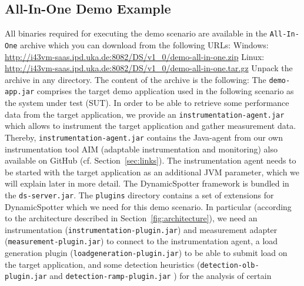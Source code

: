 \documentclass{report}
\newcommand{\DS}{DynamicSpotter }
\newcommand{\link}[1]{\textcolor[rgb]{0.0,0.0,1.0}{\href{#1}{#1}}}
\begin{document}
\subsection{All-In-One Demo Example}
All binaries required for executing the demo scenario are available in the \texttt{All-In-One} archive which you can
download from the following URLs:
\newline
\newline
Windows: \link{http://i43vm-saas.ipd.uka.de:8082/DS/v1\_0/demo-all-in-one.zip}
\newline
Linux: \link{http://i43vm-saas.ipd.uka.de:8082/DS/v1\_0/demo-all-in-one.tar.gz}
\newline
\newline
Unpack the archive in any directory. The content of the archive is the following:
The \texttt{demo-app.jar} comprises the target demo application used in the following scenario as the system under test
(SUT). In order to be able to retrieve some performance data from the target application, we provide an
\texttt{instrumentation-agent.jar} which allows to instrument the target application and gather measurement data.
Thereby, \texttt{instrumentation-agent.jar} contains the Java-agent from our own instrumentation tool AIM
(adaptable instrumentation and monitoring) also available on GitHub (cf. Section~\ref{sec:links}). The
instrumentation agent needs to be started with the target application as an additional JVM parameter, which we will
explain later in more detail. The \DS framework is bundled in the \texttt{ds-server.jar}. The \texttt{plugins} directory
contains a set of extensions for \DS which we need for this demo scenario. In particular (according to the architecture
described in Section~\ref{fig:architecture}), we need an instrumentation (\texttt{instrumentation-plugin.jar}) and
measurement adapter (\texttt{measurement-plugin.jar}) to connect to the instrumentation agent, a load generation
plugin (\texttt{loadgeneration-plugin.jar}) to be able to submit load on the target application, and some detection
heuristics (\texttt{detection-olb-plugin.jar} and \texttt{detection-ramp-plugin.jar} ) for the analysis of certain
\end{document}
